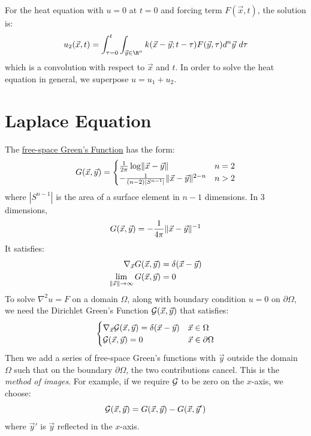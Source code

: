 \documentclass[../Main.tex]{subfiles}
\begin{document}
For the heat equation with $u = 0$ at $t = 0$ and forcing term $F(\vec{x}, t)$, the solution is:
\begin{equation*}
    u_2(\vec{x}, t) = \int_{\tau = 0}^{t} \int_{\vec{y} \in \R^n} k(\vec{x} - \vec{y}; t - \tau) F(\vec{y}, \tau) d^n\vec{y}~d\tau 
\end{equation*}
which is a convolution with respect to $\vec{x}$ and $t$. In order to solve the heat equation in general, we superpose $u = u_1 + u_2$.
\section{Laplace Equation}
The \underline{free-space Green's Function} has the form:
\begin{equation*}
    G(\vec{x}, \vec{y}) =
    \begin{cases}
        \frac{1}{2\pi}\log\lVert\vec{x} - \vec{y}\rVert & n = 2 \\
        -\frac{1}{(n-2)|S^{n-1}|} \lVert\vec{x} - \vec{y}\rVert^{2-n} & n > 2
    \end{cases}
\end{equation*}
where $|S^{n-1}|$ is the area of a surface element in $n-1$ dimensions. In 3 dimensions,
\begin{equation*}
    G(\vec{x}, \vec{y}) = -\frac{1}{4\pi} \lVert\vec{x} - \vec{y}\rVert^{-1}
\end{equation*}
It satisfies:
\begin{align*}
    \nabla_{\vec{x}} G(\vec{x}, \vec{y}) &= \delta(\vec{x} - \vec{y}) \\
    \lim_{\lVert\vec{x}\rVert \to \infty} G(\vec{x}, \vec{y}) &= 0
\end{align*}
To solve $\nabla^2 u = F$ on a domain $\Omega$, along with boundary condition $u = 0$ on $\partial \Omega$, we need the Dirichlet Green's Function $\mathcal{G}(\vec{x}, \vec{y})$ that satisfies:
\begin{equation*}
    \begin{cases}
        \nabla_{\vec{x}} \mathcal{G}(\vec{x}, \vec{y}) = \delta(\vec{x} - \vec{y}) & \vec{x} \in \Omega \\
        \mathcal{G}(\vec{x}, \vec{y}) = 0 & \vec{x} \in \partial \Omega
    \end{cases}
\end{equation*}
Then we add a series of free-space Green's functions with $\vec{y}$ outside the domain $\Omega$ such that on the boundary $\partial \Omega$, the two contributions cancel. This is the \textit{method of images}. For example, if we require $\mathcal{G}$ to be zero on the $x$-axis, we choose:
\begin{equation*}
    \mathcal{G}(\vec{x}, \vec{y}) = G(\vec{x}, \vec{y}) - G(\vec{x}, \vec{y}')
\end{equation*}
where $\vec{y}'$ is $\vec{y}$ reflected in the $x$-axis.
\end{document}
